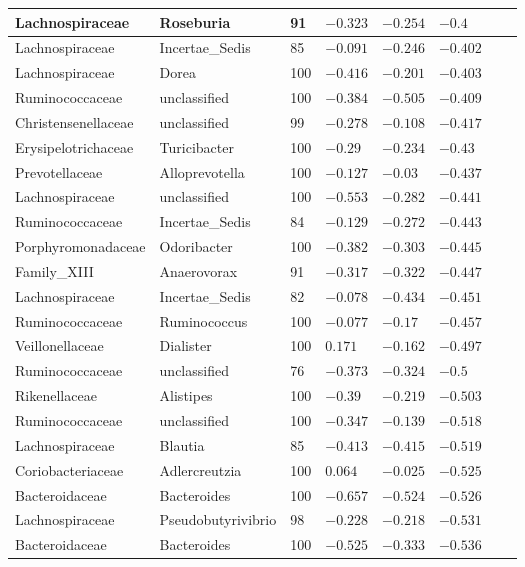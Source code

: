 \begin{table}[!ht]
\begin{tiny}
\begin{tabular}{|l|l|l|l|l|l|l|l|}
Lachnospiraceae & Roseburia & 91 & $-0.323$ & $-0.254$ & $-0.4$ \\ \hline
Lachnospiraceae & Incertae_Sedis & 85 & $-0.091$ & $-0.246$ & $-0.402$ \\ \hline
Lachnospiraceae & Dorea & 100 & $-0.416$ & $-0.201$ & $-0.403$ \\ \hline
Ruminococcaceae & unclassified & 100 & $-0.384$ & $-0.505$ & $-0.409$ \\ \hline
Christensenellaceae & unclassified & 99 & $-0.278$ & $-0.108$ & $-0.417$ \\ \hline
Erysipelotrichaceae & Turicibacter & 100 & $-0.29$ & $-0.234$ & $-0.43$ \\ \hline
Prevotellaceae & Alloprevotella & 100 & $-0.127$ & $-0.03$ & $-0.437$ \\ \hline
Lachnospiraceae & unclassified & 100 & $-0.553$ & $-0.282$ & $-0.441$ \\ \hline
Ruminococcaceae & Incertae_Sedis & 84 & $-0.129$ & $-0.272$ & $-0.443$ \\ \hline
Porphyromonadaceae & Odoribacter & 100 & $-0.382$ & $-0.303$ & $-0.445$ \\ \hline
Family_XIII & Anaerovorax & 91 & $-0.317$ & $-0.322$ & $-0.447$ \\ \hline
Lachnospiraceae & Incertae_Sedis & 82 & $-0.078$ & $-0.434$ & $-0.451$ \\ \hline
Ruminococcaceae & Ruminococcus & 100 & $-0.077$ & $-0.17$ & $-0.457$ \\ \hline
Veillonellaceae & Dialister & 100 & $0.171$ & $-0.162$ & $-0.497$ \\ \hline
Ruminococcaceae & unclassified & 76 & $-0.373$ & $-0.324$ & $-0.5$ \\ \hline
Rikenellaceae & Alistipes & 100 & $-0.39$ & $-0.219$ & $-0.503$ \\ \hline
Ruminococcaceae & unclassified & 100 & $-0.347$ & $-0.139$ & $-0.518$ \\ \hline
Lachnospiraceae & Blautia & 85 & $-0.413$ & $-0.415$ & $-0.519$ \\ \hline
Coriobacteriaceae & Adlercreutzia & 100 & $0.064$ & $-0.025$ & $-0.525$ \\ \hline
Bacteroidaceae & Bacteroides & 100 & $-0.657$ & $-0.524$ & $-0.526$ \\ \hline
Lachnospiraceae & Pseudobutyrivibrio & 98 & $-0.228$ & $-0.218$ & $-0.531$ \\ \hline
Bacteroidaceae & Bacteroides & 100 & $-0.525$ & $-0.333$ & $-0.536$ \\ \hline

\end{tabular}
\end{tiny}
\end{table}
